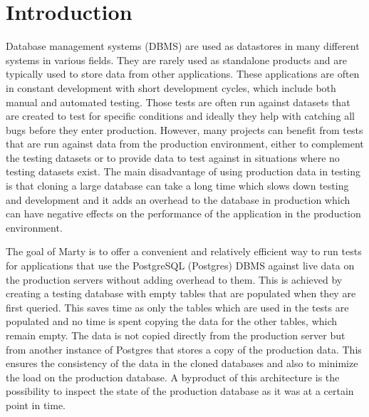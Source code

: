 \chapter{Introduction}
\setcounter{page}{1}
Database management systems (DBMS) are used as datastores in many different systems in various fields.
They are rarely used as standalone products and are typically used to store data from other applications.
These applications are often in constant development with short development cycles, which include both manual and automated testing.
Those  tests are often run against datasets that are created to test for specific conditions and ideally they help with catching all bugs before they enter production. However, many projects can benefit from tests that are run against data from the production environment, either to complement the testing datasets or to provide data to test against in situations where no testing datasets exist.
The main disadvantage of using production data in testing is that cloning a large database can take a long time which slows down testing and development and it adds an overhead to the database in production which can have negative effects on the performance of the application in the production environment.

The goal of Marty is to offer a convenient and relatively efficient way to run tests for applications that use the PostgreSQL (Postgres) DBMS against live data on the production servers without adding overhead to them.
This is achieved by creating a testing database with empty tables that are populated  when they are first queried.
This saves time as only the tables which are used in the tests are populated and no time is spent copying the data for the other tables, which remain empty.
The data is not copied directly from the production server but from another instance of Postgres that stores a copy of the production data.
This ensures the consistency of the data in the cloned databases and also to minimize the load on the production database.
A byproduct of this architecture is the possibility to inspect the state of the production database as it was at a certain point in time.

